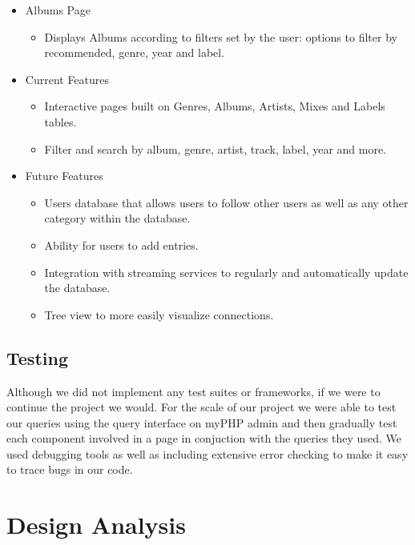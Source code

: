 \documentclass{article}
\begin{document}
\begin{itemize}
\begin{itemize}
            \end{itemize}
            \item Albums Page
            \begin{itemize}
                \item Displays Albums according to filters set by the user: options to filter by recommended, genre, year and label.
            \end{itemize}
            \item Current Features
            \begin{itemize}
                \item Interactive pages built on Genres, Albums, Artists, Mixes and Labels tables.
                \item Filter and search by album, genre, artist, track, label, year and more.
            \end{itemize}
            \item Future Features
            \begin{itemize}
                \item Users database that allows users to follow other users as well as any other category within the database.
                \item Ability for users to add entries.
                \item Integration with streaming services to regularly and automatically update the database.
                \item Tree view to more easily visualize connections.
            \end{itemize}
        \end{itemize}
    \subsection{Testing}
        Although we did not implement any test suites or frameworks, if we were to continue the project we would. For the scale of our project we were able to test our queries using 
        the query interface on myPHP admin and then gradually test each component involved in a page in conjuction with the queries they used. We used debugging tools as well as including
        extensive error checking to make it easy to trace bugs in our code.


\section{Design Analysis}
\end{document}
